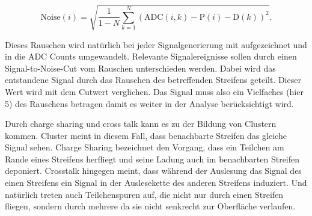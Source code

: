 \begin{equation}
  \label{eqn:noise}
  \mathup{Noise}(i) = \sqrt{ \frac{1}{1 - N}  \sum^N_{k = 1} ( \mathup{ADC}(i,k) - \mathup{P}(i) - \mathup{D}(k))^2  }.
\end{equation}

Dieses Rauschen wird natürlich bei jeder Signalgenerierung mit aufgezeichnet und in die ADC Counts umgewandelt.
Relevante Signalereignisse sollen durch einen Signal-to-Noise-Cut vom Rauschen unterschieden werden.
Dabei wird das entstandene Signal durch das Rauschen des betreffenden Streifens geteilt.
Dieser Wert wird mit dem Cutwert verglichen.
Das Signal muss also ein Vielfaches (hier 5) des Rauschens betragen damit es weiter in der Analyse berücksichtigt wird.

Durch charge sharing und cross talk kann es zu der Bildung von Clustern kommen.
Cluster meint in diesem Fall, dass benachbarte Streifen das gleiche Signal sehen.
Charge Sharing bezeichnet den Vorgang, dass ein Teilchen am Rande eines Streifens herfliegt und seine Ladung auch im benachbarten Streifen deponiert.
Crosstalk hingegen meint, dass während der Auslesung das Signal des einen Streifens ein Signal in der Auslesekette des anderen Streifens induziert.
Und natürlich treten auch Teilchenspuren auf, die nicht nur durch einen Streifen fliegen, sondern durch mehrere da sie nicht senkrecht zur Oberfläche verlaufen.


















%
